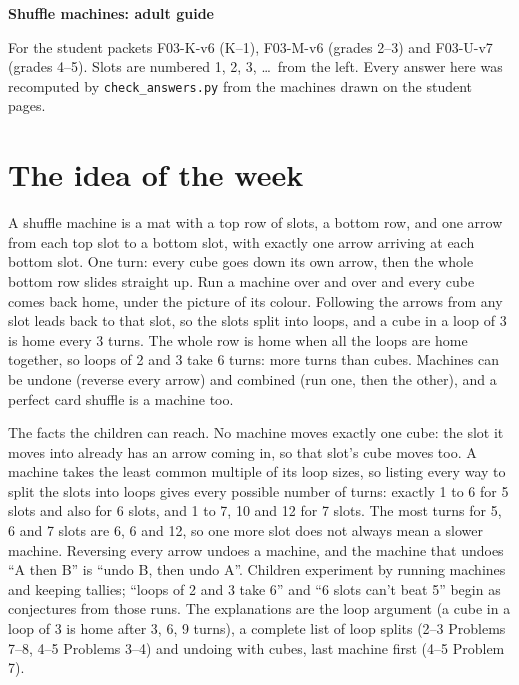 \documentclass[11pt,letterpaper]{extarticle}
\begin{document}
{\Large\bfseries Shuffle machines: adult guide}\par
\vspace{2pt}
{\small For the student packets F03-K-v6 (K--1), F03-M-v6 (grades 2--3) and F03-U-v7 (grades 4--5). Slots are numbered 1, 2, 3, \dots\ from the left. Every answer here was recomputed by \texttt{check\_answers.py} from the machines drawn on the student pages.}

\section{The idea of the week}

A shuffle machine is a mat with a top row of slots, a bottom row, and one arrow from each top slot to a bottom slot, with exactly one arrow arriving at each bottom slot. One turn: every cube goes down its own arrow, then the whole bottom row slides straight up. Run a machine over and over and every cube comes back home, under the picture of its colour. Following the arrows from any slot leads back to that slot, so the slots split into loops, and a cube in a loop of 3 is home every 3 turns. The whole row is home when all the loops are home together, so loops of 2 and 3 take 6 turns: more turns than cubes. Machines can be undone (reverse every arrow) and combined (run one, then the other), and a perfect card shuffle is a machine too.

The facts the children can reach. No machine moves exactly one cube: the slot it moves into already has an arrow coming in, so that slot's cube moves too. A machine takes the least common multiple of its loop sizes, so listing every way to split the slots into loops gives every possible number of turns: exactly 1 to 6 for 5 slots and also for 6 slots, and 1 to 7, 10 and 12 for 7 slots. The most turns for 5, 6 and 7 slots are 6, 6 and 12, so one more slot does not always mean a slower machine. Reversing every arrow undoes a machine, and the machine that undoes ``A then B'' is ``undo B, then undo A''. Children experiment by running machines and keeping tallies; ``loops of 2 and 3 take 6'' and ``6 slots can't beat 5'' begin as conjectures from those runs. The explanations are the loop argument (a cube in a loop of 3 is home after 3, 6, 9 turns), a complete list of loop splits (2--3 Problems 7--8, 4--5 Problems 3--4) and undoing with cubes, last machine first (4--5 Problem 7).
\end{document}
